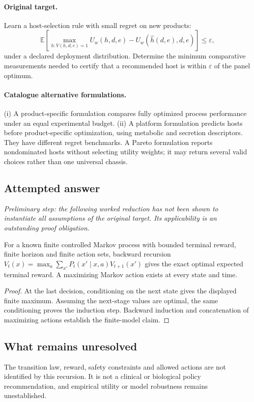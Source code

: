 \documentclass[11pt]{article}
\begin{document}
\paragraph{Original target.}
Learn a host-selection rule with small regret on new products:
\[
\mathbb{E}\left[\max_{h:V(h,d,e)=1}U_w(h,d,e)
-U_w(\widehat h(d,e),d,e)\right]\leq\varepsilon,
\]
under a declared deployment distribution. Determine the minimum comparative measurements needed to certify that a recommended host is within $\varepsilon$ of the panel optimum.
\paragraph{Catalogue alternative formulations.}
(i) A product-specific formulation compares fully optimized process performance under an equal experimental budget. (ii) A platform formulation predicts hosts before product-specific optimization, using metabolic and secretion descriptors. They have different regret benchmarks. A Pareto formulation reports nondominated hosts without selecting utility weights; it may return several valid choices rather than one universal chassis.
\subsection{Attempted answer}
\noindent\emph{Preliminary step: the following worked reduction has not been shown to instantiate all assumptions of the original target. Its applicability is an outstanding proof obligation.}

\begin{proposition}
For a known finite controlled Markov process with bounded terminal reward, finite horizon and finite action sets, backward recursion $V_t(x)=\max_a\sum_{x\prime}P_t(x\prime\mid x,a)V_{t+1}(x\prime)$ gives the exact optimal expected terminal reward. A maximizing Markov action exists at every state and time.
\end{proposition}
\begin{proof}
At the last decision, conditioning on the next state gives the displayed finite maximum. Assuming the next-stage values are optimal, the same conditioning proves the induction step. Backward induction and concatenation of maximizing actions establish the finite-model claim.
\end{proof}
\subsection{What remains unresolved}
The transition law, reward, safety constraints and allowed actions are not identified by this recursion. It is not a clinical or biological policy recommendation, and empirical utility or model robustness remains unestablished.
\end{document}
